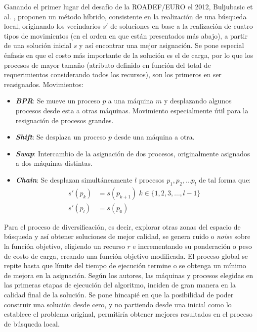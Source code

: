 \documentclass[../informe2.tex]{subfiles}
\begin{document}
Ganando el primer lugar \cite{2012ROADEFresults} del desafío de la ROADEF/EURO el 2012, Buljubasic et al. \cite{gavranovic2012variable}, proponen un método híbrido, consistente en la realización de una búsqueda local, originando los vecindarios $s'$ de soluciones en base a la realización de cuatro tipos de movimientos (en el orden en que están presentados más abajo), a partir de una solución inicial $s$ y así encontrar una mejor asignación. Se pone especial énfasis en que el costo más importante de la solución es el de carga, por lo que los procesos de mayor tamaño (atributo definido en función del total de requerimientos considerando todos los recursos), son los primeros en ser reasignados.
Movimientos:
\begin{itemize}
	\item \textbf{\emph{BPR}}: Se mueve un proceso $p$ a una máquina $m$ y desplazando algunos procesos desde esta a otras máquinas. Movimiento especialmente útil para la resignación de procesos grandes.
	\item \textbf{\emph{Shift}}: Se desplaza un proceso $p$ desde una máquina a otra.
	\item \textbf{\emph{Swap}}:	Intercambio de la asignación de dos procesos, originalmente asignados a dos máquinas distintas.
	\item \textbf{\emph{Chain}}: Se desplazan simultáneamente $l$ procesos $p_1, p_2, ... p_l$ de tal forma que:
		\begin{align}
			s'(p_k) &= s(p_{k+1}) \; k \in \{1,2,3,...,l-1\} \nonumber \\
			s'(p_l) &= s(p_0) \nonumber
		\end{align}
\end{itemize}
Para el proceso de diversificación, es decir, explorar otras zonas del espacio de búsqueda y así obtener soluciones de mejor calidad, se genera ruido o \textit{noise} sobre la función objetivo, eligiendo un recurso $r$ e incrementando su ponderación o peso de costo de carga, creando una función objetivo modificada. El proceso global se repite hasta que límite del tiempo de ejecución termine o se obtenga un mínimo de mejora en la asignación. Según los autores, las máquinas y procesos elegidas en las primeras etapas de ejecución del algoritmo, inciden de gran manera en la calidad final de la solución. Se pone hincapié en que la posibilidad de poder construir una solución desde cero, y no partiendo desde una inicial como lo establece el problema original, permitiría obtener mejores resultados en el proceso de búsqueda local.\\
\end{document}
